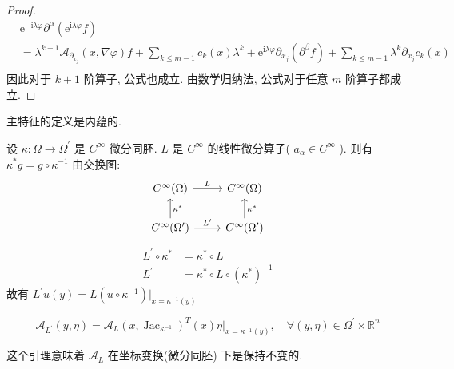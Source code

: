 \documentclass[11pt]{ctexart}[UTF8]
\begin{document}
\begin{proof}
\begin{equation*}
        \begin{aligned}
            &\mathrm{e}^{-\mathrm{i} \lambda \varphi} \partial^{\alpha} \left( \mathrm{e}^{\mathrm{i} \lambda \varphi} f \right) \\
            & = \lambda^{k+1} \mathscr{A}_{\partial_{x_j}}(x, \nabla \varphi) f + \sum\limits_{k \leq m-1} c_{k}(x) \lambda^k + \mathrm{e}^{\mathrm{i} \lambda \varphi} \partial_{x_j} \left( \partial^{\beta} f \right) + \sum\limits_{k \leq m -1} \lambda^k \partial_{x_j} c_{k}(x) \\
        \end{aligned}
    \end{equation*}
    因此对于 $k+1$ 阶算子, 公式也成立. 由数学归纳法, 公式对于任意 $m$ 阶算子都成立.
\end{proof}
\begin{theorem}
    主特征的定义是内蕴的.
\end{theorem}
设 $\kappa: \Omega \longrightarrow \Omega^{\prime}$ 是 $C^{\infty}$ 微分同胚. $L$ 是 $C^{\infty}$ 的线性微分算子( $a_\alpha \in C^{\infty}$ ).
则有 $\kappa^{*}g = g \circ \kappa^{-1}$
由交换图:
$$
\begin{tikzcd}
    C^{\infty}(\Omega) \arrow[r, "L"] & C^{\infty}(\Omega) \\
    C^{\infty}(\Omega^{\prime}) \arrow[r, "L^{\prime}"] \arrow[u, "\kappa^{*}"'] & C^{\infty}(\Omega^{\prime}) \arrow[u, "\kappa^{*}"']
\end{tikzcd}
$$
\begin{equation*}
    \begin{aligned}
        L^{\prime} \circ \kappa^{*} & = \kappa^{*} \circ L \\
        L^{\prime} & = \kappa^{*} \circ L \circ (\kappa^{*})^{-1}
    \end{aligned}
\end{equation*}
故有 $L^{\prime}u(y) = L(u \circ \kappa^{-1})\big|_{x=\kappa^{-1}(y)}$

\begin{lemma}
    $$\mathscr{A}_{L^{\prime}}(y,\eta) = \mathscr{A}_{L}(x,\operatorname{Jac}_{\kappa^{-1}})^{T}(x)\eta\big|_{x=\kappa^{-1}(y)},\quad \forall (y,\eta) \in \Omega^{\prime}\times \mathbb{R}^{n}  $$
\end{lemma}
这个引理意味着 $\mathscr{A}_{L}$ 在坐标变换(微分同胚) 下是保持不变的.
\end{document}
